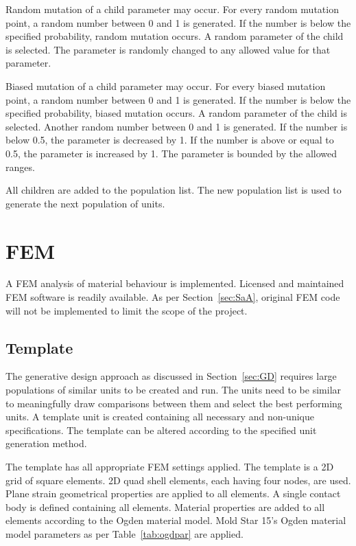 Random mutation of a child parameter may occur. For every random mutation point, a random number between 0 and 1 is generated. If the number is below the specified probability, random mutation occurs. A random parameter of the child is selected. The parameter is randomly changed to any allowed value for that parameter.

Biased mutation of a child parameter may occur. For every biased mutation point, a random number between 0 and 1 is generated. If the number is below the specified probability, biased mutation occurs. A random parameter of the child is selected. Another random number between 0 and 1 is generated. If the number is below 0.5, the parameter is decreased by 1. If the number is above or equal to 0.5, the parameter is increased by 1. The parameter is bounded by the allowed ranges.

All children are added to the population list. The new population list is used to generate the next population of units.

\section{FEM}

A FEM analysis of material behaviour is implemented. Licensed and maintained FEM software is readily available. As per Section~\ref{sec:SaA}, original FEM code will not be implemented to limit the scope of the project.

\subsection{Template}

The generative design approach as discussed in Section~\ref{sec:GD} requires large populations of similar units to be created and run. The units need to be similar to meaningfully draw comparisons between them and select the best performing units. A template unit is created containing all necessary and non-unique specifications. The template can be altered according to the specified unit generation method.

The template has all appropriate FEM settings applied. The template is a 2D grid of square elements. 2D quad shell elements, each having four nodes, are used. Plane strain geometrical properties are applied to all elements. A single contact body is defined containing all elements. Material properties are added to all elements according to the Ogden material model. Mold Star 15's Ogden material model parameters as per Table~\ref{tab:ogdpar} are applied.

